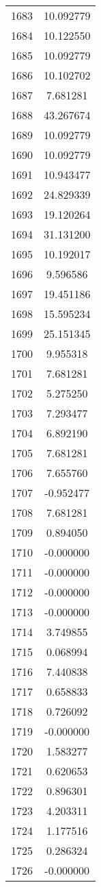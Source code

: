 \documentclass[12pt]{article}
\begin{document}
\begin{longtable}{@{}cc@{}}
1683 & 10.092779 \\
1684 & 10.122550 \\
1685 & 10.092779 \\
1686 & 10.102702 \\
1687 & 7.681281 \\
1688 & 43.267674 \\
1689 & 10.092779 \\
1690 & 10.092779 \\
1691 & 10.943477 \\
1692 & 24.829339 \\
1693 & 19.120264 \\
1694 & 31.131200 \\
1695 & 10.192017 \\
1696 & 9.596586 \\
1697 & 19.451186 \\
1698 & 15.595234 \\
1699 & 25.151345 \\
1700 & 9.955318 \\
1701 & 7.681281 \\
1702 & 5.275250 \\
1703 & 7.293477 \\
1704 & 6.892190 \\
1705 & 7.681281 \\
1706 & 7.655760 \\
1707 & -0.952477 \\
1708 & 7.681281 \\
1709 & 0.894050 \\
1710 & -0.000000 \\
1711 & -0.000000 \\
1712 & -0.000000 \\
1713 & -0.000000 \\
1714 & 3.749855 \\
1715 & 0.068994 \\
1716 & 7.440838 \\
1717 & 0.658833 \\
1718 & 0.726092 \\
1719 & -0.000000 \\
1720 & 1.583277 \\
1721 & 0.620653 \\
1722 & 0.896301 \\
1723 & 4.203311 \\
1724 & 1.177516 \\
1725 & 0.286324 \\
1726 & -0.000000 \\

\end{longtable}
\end{document}

